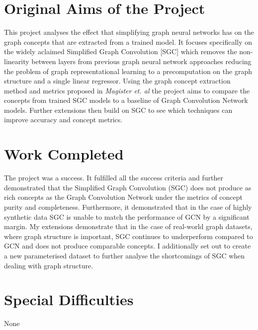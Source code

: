 \documentclass[12pt,a4paper,twoside,openright]{report}
\begin{document}


\section*{Original Aims of the Project}


This project analyses the effect that simplifying graph neural networks has on the graph concepts that are extracted from a trained model.
It focuses specifically on the widely aclaimed Simplified Graph Convolution \cite{wu2019simplifying}[SGC] which removes the non-linearity between layers from previous graph neural network approaches reducing the problem of graph representational learning to a precomputation on the graph structure and a single linear regressor.
Using the graph concept extraction method and metrics proposed in \textit{Magister et. al} \cite{magister2021gcexplainer} the project aims to compare the concepts from trained SGC models to a baseline of Graph Convolution Network models.
Further extensions then build on SGC to see which techniques can improve accuracy and concept metrics.

\section*{Work Completed}

The project was a success. 
It fulfilled all the success criteria and further demonstrated that the Simplified Graph Convolution (SGC) does not produce as rich concepts as the Graph Convolution Network under the metrics of concept purity and completeness. 
Furthermore, it demonstrated that in the case of highly synthetic data SGC is unable to match the performance of GCN by a significant margin. 
My extensions demonstrate that in the case of real-world graph datasets, where graph structure is important, SGC continues to underperform compared to GCN and does not produce comparable concepts.
I additionally set out to create a new parameterised dataset to further analyse the shortcomings of SGC when dealing with graph structure.

\section*{Special Difficulties}

None


\pagestyle{headings}

\tableofcontents







\appendix



\end{document}
